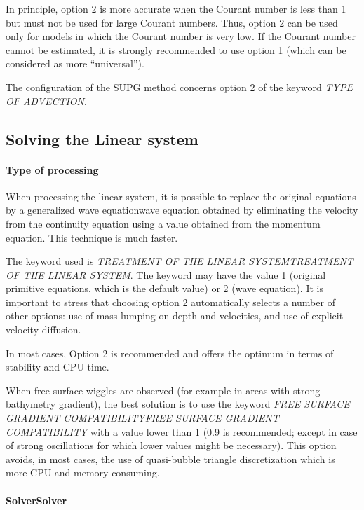\documentclass{article} %
\begin{document}
 In principle, option 2 is more accurate when the Courant number is less than 1 but must not be used for large Courant numbers. Thus, option 2 can be used only for models in which the Courant number is very low. If the Courant number cannot be estimated, it is strongly recommended to use option 1 (which can be considered as more ``universal'').

 The configuration of the SUPG method concerns option 2 of the keyword \textit{TYPE OF ADVECTION}.


\subsection{  Solving the Linear system}


\paragraph{ Type of processing}

 When processing the linear system, it is possible to replace the original equations by a generalized wave equationwave equation obtained by eliminating the velocity from the continuity equation using a value obtained from the momentum equation. This technique is much faster.

 The keyword used is \textit{TREATMENT OF THE LINEAR SYSTEMTREATMENT OF THE LINEAR SYSTEM}. The keyword may have the value 1 (original primitive equations, which is the default value) or 2 (wave equation). It is important to stress that choosing option 2 automatically selects a number of other options: use of mass lumping on depth and velocities, and use of explicit velocity diffusion.

 In most cases, Option 2 is recommended and offers the optimum in terms of stability and CPU time.

 When free surface wiggles are observed (for example in areas with strong bathymetry gradient), the best solution is to use the keyword \textit{FREE SURFACE GRADIENT COMPATIBILITYFREE SURFACE GRADIENT COMPATIBILITY} with a value lower than 1 (0.9 is recommended; except in case of strong oscillations for which lower values might be necessary). This option avoids, in most cases, the use of quasi-bubble triangle discretization which is more CPU and memory consuming.


\paragraph{ SolverSolver}
\end{document}
